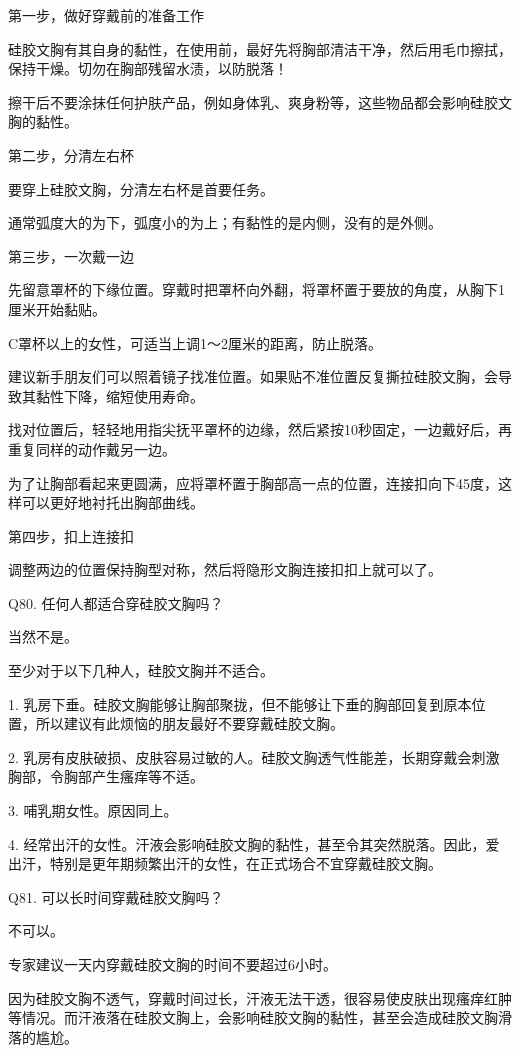 \documentclass[12pt,UTF8]{ctexbook}
\begin{document}
第一步，做好穿戴前的准备工作

硅胶文胸有其自身的黏性，在使用前，最好先将胸部清洁干净，然后用毛巾擦拭，保持干燥。切勿在胸部残留水渍，以防脱落！

擦干后不要涂抹任何护肤产品，例如身体乳、爽身粉等，这些物品都会影响硅胶文胸的黏性。

第二步，分清左右杯

要穿上硅胶文胸，分清左右杯是首要任务。

通常弧度大的为下，弧度小的为上；有黏性的是内侧，没有的是外侧。

第三步，一次戴一边

先留意罩杯的下缘位置。穿戴时把罩杯向外翻，将罩杯置于要放的角度，从胸下1厘米开始黏贴。

C罩杯以上的女性，可适当上调1～2厘米的距离，防止脱落。

建议新手朋友们可以照着镜子找准位置。如果贴不准位置反复撕拉硅胶文胸，会导致其黏性下降，缩短使用寿命。

找对位置后，轻轻地用指尖抚平罩杯的边缘，然后紧按10秒固定，一边戴好后，再重复同样的动作戴另一边。

为了让胸部看起来更圆满，应将罩杯置于胸部高一点的位置，连接扣向下45度，这样可以更好地衬托出胸部曲线。

第四步，扣上连接扣

调整两边的位置保持胸型对称，然后将隐形文胸连接扣扣上就可以了。





Q80. 任何人都适合穿硅胶文胸吗？


当然不是。

至少对于以下几种人，硅胶文胸并不适合。

1. 乳房下垂。硅胶文胸能够让胸部聚拢，但不能够让下垂的胸部回复到原本位置，所以建议有此烦恼的朋友最好不要穿戴硅胶文胸。

2. 乳房有皮肤破损、皮肤容易过敏的人。硅胶文胸透气性能差，长期穿戴会刺激胸部，令胸部产生瘙痒等不适。

3. 哺乳期女性。原因同上。

4. 经常出汗的女性。汗液会影响硅胶文胸的黏性，甚至令其突然脱落。因此，爱出汗，特别是更年期频繁出汗的女性，在正式场合不宜穿戴硅胶文胸。





Q81. 可以长时间穿戴硅胶文胸吗？


不可以。

专家建议一天内穿戴硅胶文胸的时间不要超过6小时。

因为硅胶文胸不透气，穿戴时间过长，汗液无法干透，很容易使皮肤出现瘙痒红肿等情况。而汗液落在硅胶文胸上，会影响硅胶文胸的黏性，甚至会造成硅胶文胸滑落的尴尬。
\end{document}
